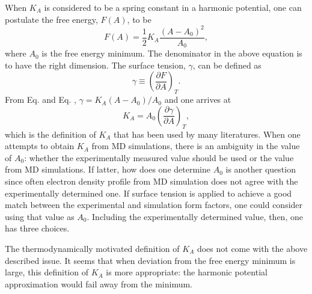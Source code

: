 \documentclass[letterpaper,12pt]{article}
\begin{document}
When $K_A$ is considered to be a spring constant in a harmonic potential, one 
can postulate the free energy, $F(A)$, to be
\begin{equation}
  F(A) = \frac{1}{2}K_A\frac{(A-A_0)^2}{A_0},
\end{equation}
where $A_0$ is the free energy minimum. The denominator in the above equation 
is to have the right dimension. The surface tension, $\gamma$, can be defined 
as
\begin{equation}
  \gamma \equiv \left(\frac{\partial F}{\partial A}\right)_T.
\end{equation}
From Eq. and Eq. , $\gamma = K_A(A-A_0)/A_0$ and one arrives at
\begin{equation}
  K_A = A_0\left(\frac{\partial \gamma}{\partial A}\right)_T,
\end{equation}
which is the definition of $K_A$ that has been used by many literatures.  
When one attempts to obtain $K_A$ from MD simulations, there is an ambiguity 
in the value of $A_0$: whether the experimentally measured value should be 
used or the value from MD simulations. If latter, how does one determine $A_0$ 
is another question since often electron density profile from MD simulation 
does not agree with the experimentally determined one. If surface tension is 
applied to achieve a good match between the experimental and simulation form 
factors, one could consider using that value as $A_0$. Including the 
experimentally determined value, then, one has three choices. 

The thermodynamically motivated definition of $K_A$ does not come with the 
above described issue. It seems that when deviation from the free energy 
minimum is large, this definition of $K_A$ is more appropriate: the harmonic 
potential approximation would fail away from the minimum. 
\end{document}
